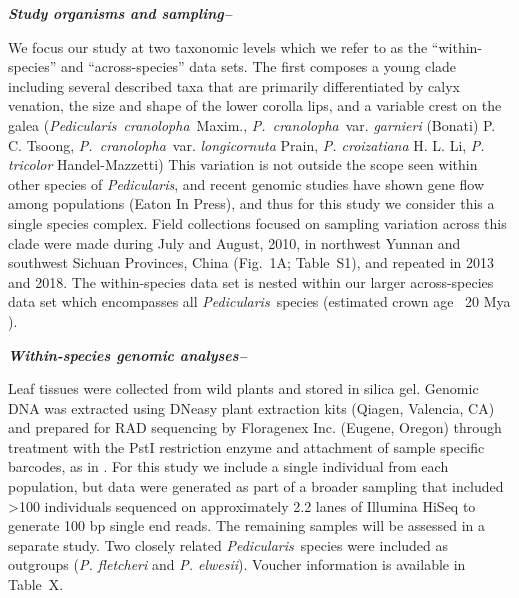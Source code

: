 \documentclass[12pt,letterpaper]{article}
\def\PC{\emph{P.~cranolopha}}
\def\P{\emph{Pedicularis}}
\renewcommand{\subsection}[1]{%
\bigskip
{\noindent \normalfont \bf \emph{#1}}
}
\begin{document}
\subsection{Study organisms and sampling--}
We focus our study at two taxonomic levels which we refer to as the ``within-species'' and ``across-species'' data sets. The first composes a young clade including several described taxa that are primarily differentiated by calyx venation, the size and shape of the lower corolla lips, and a variable crest on the galea (\P~\emph{cranolopha}~Maxim., \PC~var. \emph{garnieri} (Bonati) P. C. Tsoong, \PC~var. \emph{longicornuta} Prain, \emph{P. croizatiana} H. L. Li, \emph{P. tricolor} Handel-Mazzetti)
This variation is not outside the scope seen within other species of \P, and recent genomic studies have shown gene flow among populations (Eaton In Press), and thus 
for this study we consider this a single species complex. Field collections focused on sampling variation across this clade were made during July and August, 2010, in northwest Yunnan and southwest Sichuan Provinces, China (Fig.~1A; Table~S1), and repeated in 2013 and 2018. The within-species data set is nested within our larger across-species data set which encompasses all \P~species (estimated crown age ~20 Mya \citep{ree_new_paper}). %

\subsection{Within-species genomic analyses--}
Leaf tissues were collected from wild plants and stored in silica gel. Genomic DNA was extracted using DNeasy plant extraction kits (Qiagen, Valencia, CA) and prepared for RAD sequencing by Floragenex Inc. (Eugene, Oregon) through treatment with the PstI restriction enzyme and attachment of sample specific barcodes, as in \citep{baird_rapid_2008}. For this study we include a single individual from each population, but data were generated as part of a broader sampling that included >100 individuals sequenced on approximately 2.2 lanes of Illumina HiSeq to generate 100 bp single end reads. The remaining samples will be assessed in a separate study. Two closely related \P~species were included as outgroups (\emph{P. fletcheri} and \emph{P. elwesii}). Voucher information is available in Table~X. 
\end{document}
